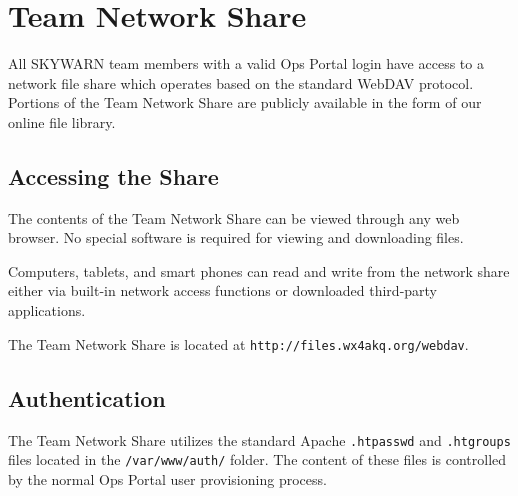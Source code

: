\documentclass[pdflatex,letterpaper,twoside,12pt]{book}
\begin{document}
\chapter{Team Network Share}\label{team-network-share}

All SKYWARN team members with a valid Ops Portal login have access to a network file share which operates based on the standard WebDAV protocol.  Portions of the Team Network Share are publicly available in the form of our online file library.


\section{Accessing the Share}

The contents of the Team Network Share can be viewed through any web browser.  No special software is required for viewing and downloading files.

Computers, tablets, and smart phones can read and write from the network share either via built-in network access functions or downloaded third-party applications.

The Team Network Share is located at \texttt{http://files.wx4akq.org/webdav}.



\section{Authentication}

The Team Network Share utilizes the standard Apache \texttt{.htpasswd} and \texttt{.htgroups} files located in the \texttt{/var/www/auth/} folder.  The content of these files is controlled by the normal Ops Portal user provisioning process.

\end{document}
